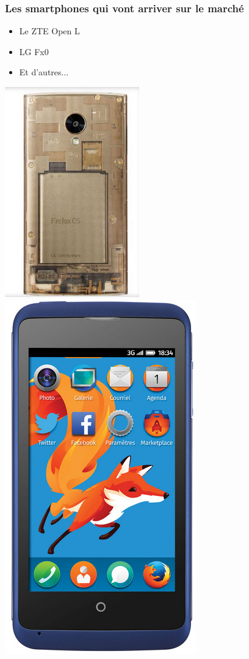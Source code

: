\documentclass{beamer}
\begin{document}
\begin{frame}
\frametitle{Les smartphones qui vont arriver sur le marché}
\begin{itemize}
\item Le ZTE Open L
\item LG Fx0
\item Et d'autres...
\end{itemize}
\begin{center}
\includegraphics[scale=0.5]{./images/ffos_lg.jpg}
~~~
\includegraphics[scale=0.3]{./images/ZE_Open_C.jpg}
\end{center}
\end{frame}
\end{document}
